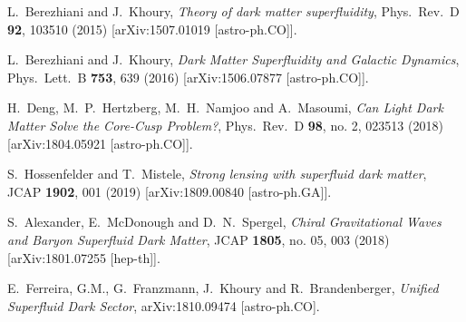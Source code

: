 \documentclass[aps,prd,twocolumn,nofootinbib,superscriptaddress]{revtex4-1}
\begin{document}
\begin{thebibliography}{99}


  L.~Berezhiani and J.~Khoury,
  \emph{Theory of dark matter superfluidity},
  Phys.\ Rev.\ D {\bf 92}, 103510 (2015)
  [arXiv:1507.01019 [astro-ph.CO]].
  
  L.~Berezhiani and J.~Khoury,
  \emph{Dark Matter Superfluidity and Galactic Dynamics},
  Phys.\ Lett.\ B {\bf 753}, 639 (2016)
  [arXiv:1506.07877 [astro-ph.CO]].


  H.~Deng, M.~P.~Hertzberg, M.~H.~Namjoo and A.~Masoumi,
  \emph{Can Light Dark Matter Solve the Core-Cusp Problem?},
  Phys.\ Rev.\ D {\bf 98}, no. 2, 023513 (2018)
  [arXiv:1804.05921 [astro-ph.CO]].

  S.~Hossenfelder and T.~Mistele,
  \emph{Strong lensing with superfluid dark matter},
  JCAP {\bf 1902}, 001 (2019)
  [arXiv:1809.00840 [astro-ph.GA]].

  S.~Alexander, E.~McDonough and D.~N.~Spergel,
  \emph{Chiral Gravitational Waves and Baryon Superfluid Dark Matter},
  JCAP {\bf 1805}, no. 05, 003 (2018)
  [arXiv:1801.07255 [hep-th]].

  E.~Ferreira, G.M., G.~Franzmann, J.~Khoury and R.~Brandenberger,
  \emph{Unified Superfluid Dark Sector},
  arXiv:1810.09474 [astro-ph.CO].


\end{thebibliography}
\end{document}
